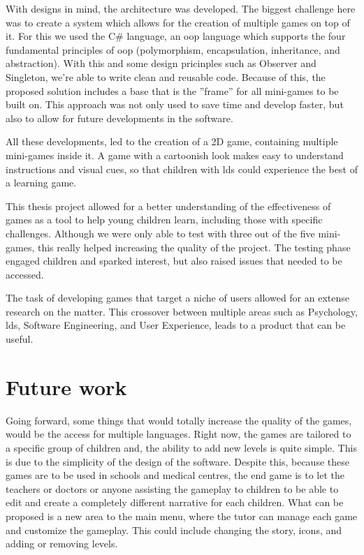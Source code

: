 With designs in mind, the architecture was developed. The biggest challenge here was to create a system which allows for the creation of multiple games on top of it. For this we used the C\# language, an \gls{oop} language which supports the four fundamental principles of \gls{oop} (polymorphism, encapsulation, inheritance, and abstraction). With this and some design pricinples such as Observer and Singleton, we're able to write clean and reusable code. Because of this, the proposed solution includes a base that is the ''frame'' for all mini-games to be built on. This approach was not only used to save time and develop faster, but also to allow for future developments in the software. 


All these developments, led to the creation of a 2D game, containing multiple mini-games inside it. A game with a cartoonish look makes easy to understand instructions and visual cues, so that children with \gls{ld}s could experience the best of a learning game.

This thesis project allowed for a better understanding of the effectiveness of games as a tool to help young children learn, including those with specific challenges. Although we were only able to test with three out of the five mini-games, this really helped increasing the quality of the project. The testing phase engaged children and sparked interest, but also raised issues that needed to be accessed.

The task of developing games that target a niche of users allowed for an extense research on the matter. This crossover between multiple areas such as Psychology, \gls{ld}s, Software Engineering, and User Experience, leads to a product that can be useful. 

\section{Future work}
\label{futureWork}

Going forward, some things that would totally increase the quality of the games, would be the access for multiple languages. Right now, the games are tailored to a specific group of children and, the ability to add new levels is quite simple. This is due to the simplicity of the design of the software. Despite this, because these games are to be used in schools and medical centres, the end game is to let the teachers or doctors or anyone assisting the gameplay to children to be able to edit and create a completely different narrative for each children. What can be proposed is a new area to the main menu, where the tutor can manage each game and customize the gameplay. This could include changing the story, icons, and adding or removing levels.

